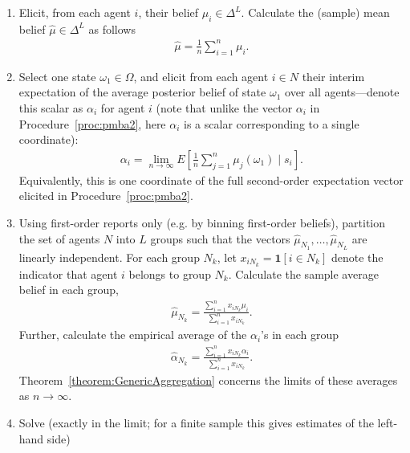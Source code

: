 \documentclass[12pt,reqno]{amsart}
\begin{document}
\begin{framedbox}[htbp]
  \caption{Approximate Population-Mean-Based Aggregation}\label{proc:lipmba}
  \begin{minipage}{0.95\textwidth}
    \begin{enumerate}
\item Elicit, from each agent $i$, their belief $\mu_i \in \Delta^L$. Calculate the (sample) mean belief $\hat{\mu} \in \Delta^L$ as follows
    \begin{align*}
        \hat{\mu} = \frac1n \sum_{i=1}^n \mu_i.
    \end{align*}
    \item Select one state $\omega_1 \in \Omega$, and elicit from each agent $i \in N$ their interim expectation of the average posterior belief of state $\omega_1$ over all agents---denote this scalar as $\alpha_i$ for agent $i$ (note that unlike the vector $\alpha_i$ in Procedure~\ref{proc:pmba2}, here $\alpha_i$ is a scalar corresponding to a single coordinate):
\begin{align*}
        \alpha_i = \lim_{n \rightarrow \infty} E\left[\frac1n \sum_{j=1}^n \mu_j(\omega_1) \mid s_i\right].
    \end{align*}
    Equivalently, this is one coordinate of the full second-order expectation vector elicited in Procedure~\ref{proc:pmba2}.
\item Using first-order reports only (e.g. by binning first-order beliefs), partition the set of agents $N$ into $L$ groups such that the vectors
$\hat{\mu}_{N_1},\ldots,\hat{\mu}_{N_L}$ are linearly independent. For each group $N_k$, let $x_{iN_k}=\mathbf{1}[i \in N_k]$ denote the indicator that agent $i$ belongs to group $N_k$. Calculate the sample average belief in each group,
\begin{align*}
        \hat{\mu}_{N_k}=\frac{\sum_{i=1}^n x_{iN_k}\mu_i}{\sum_{i=1}^n x_{iN_k}}.
    \end{align*}
    Further, calculate the empirical average of the $\alpha_i$'s in each group 
    \begin{align*}
        \hat{\alpha}_{N_k}=\frac{\sum_{i=1}^n x_{iN_k}\alpha_i}{\sum_{i=1}^n x_{iN_k}}.
    \end{align*}
    Theorem~\ref{theorem:GenericAggregation} concerns the limits of these averages as $n\to\infty$.
    \item Solve (exactly in the limit; for a finite sample this gives estimates of the left-hand side)
   

\end{enumerate}
\end{minipage}
\end{framedbox}
\end{document}
